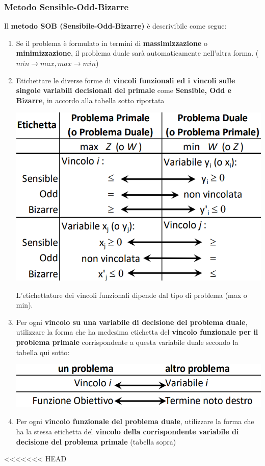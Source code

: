 \documentclass[12pt]{article}
\begin{document}
\subsubsection{Metodo Sensible-Odd-Bizarre}
Il \textbf{metodo SOB (Sensibile-Odd-Bizarre)} è descrivibile come segue:
\begin{enumerate}
    \item Se il problema è formulato in termini di \textbf{massimizzazione} o \textbf{minimizzazione}, il problema duale sarà automaticamente nell'altra forma. ($min \rightarrow max, max \rightarrow min$)
    \item Etichettare le diverse forme di \textbf{vincoli funzionali ed i vincoli sulle singole variabili decisionali del primale} come \textbf{Sensible, Odd e Bizarre}, in accordo alla tabella sotto riportata
    \begin{center}
        \includegraphics[width = 0.60\linewidth]{Images/59.png}
    \end{center}
    L'etichettature dei vincoli funzionali dipende dal tipo di problema (max o min).
    \item Per ogni \textbf{vincolo su una variabile di decisione del problema duale}, utilizzare la forma che ha medesima etichetta del \textbf{vincolo funzionale per il problema primale} corrispondente
    a questa variabile duale secondo la tabella qui sotto:
    \begin{center}
        \includegraphics[width = 0.60\linewidth]{Images/60.png}
    \end{center}
    \item Per ogni \textbf{vincolo funzionale del problema duale}, utilizzare la forma che ha la stessa etichetta del \textbf{vincolo della corrispondente variabile di decisione del problema primale} (tabella sopra)
\end{enumerate}
<<<<<<< HEAD
\end{document}
